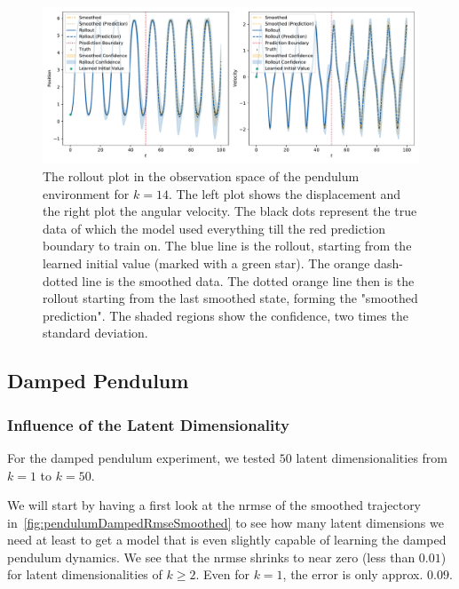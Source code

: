 			\begin{figure}
				\centering
				\includegraphics[width=\linewidth]{figures/results/pendulum/run-latent-dim-14/rollout-observations-N0.pdf}
				\caption{The rollout plot in the observation space of the pendulum environment for \(k = 14\). The left plot shows the displacement and the right plot the angular velocity. The black dots represent the true data of which the model used everything till the red prediction boundary to train on. The blue line is the rollout, starting from the learned initial value (marked with a green star). The orange dash-dotted line is the smoothed data. The dotted orange line then is the rollout starting from the last smoothed state, forming the "smoothed prediction". The shaded regions show the confidence, \ie two times the standard deviation.}
				\label{fig:pendulumRolloutL14}
			\end{figure}

	\subsection{Damped Pendulum} %

		\subsubsection{Influence of the Latent Dimensionality}
			For the damped pendulum experiment, we tested \(50\) latent dimensionalities from \( k = 1 \) to \( k = 50 \).

			We will start by having a first look at the \ac{nrmse} of the smoothed trajectory in~\autoref{fig:pendulumDampedRmseSmoothed} to see how many latent dimensions we need at least to get a model that is even slightly capable of learning the damped pendulum dynamics. We see that the \ac{nrmse} shrinks to near zero (less than \( 0.01 \)) for latent dimensionalities of \( k \geq 2 \). Even for \( k = 1 \), the error is only approx. \( 0.09 \).

